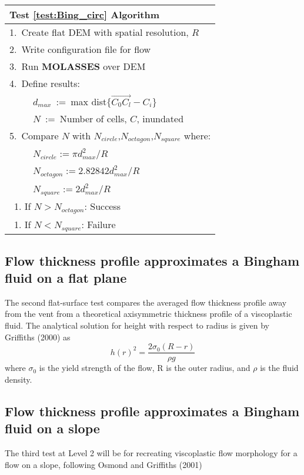 \documentclass[12pt,letter]{article}
\newcommand{\tabitem}{~~\llap{\textbullet}~~}
\begin{document}
\begin{center}
	\begin{tabular}{l}
		\toprule
		\textbf{Test \ref{test:Bing_circ} Algorithm}\\
		\midrule
		1.~Create flat DEM with spatial resolution, $R$\\
		2.~Write configuration file for flow\\
		3.~Run \textbf{MOLASSES} over DEM\\
		4.~Define results:\\
			~\tabitem $d_{max}$~:=~max dist$\{\overrightarrow{C_0C_l}-C_i\}$\\
			~\tabitem $N$~:=~Number of cells, $C$, inundated\\
		5.~Compare $N$ with $N_{circle}$,$N_{octagon}$,$N_{square}$ where:\\
			~\tabitem $N_{circle}:=\pi d_{max}^2/R$\\
			~\tabitem $N_{octagon}:=2.82842 d_{max}^2/R$\\
			~\tabitem $N_{square}:=2d_{max}^2/R$\\
			~1. If $N>N_{octagon}$: Success\\
			~1. If $N<N_{square}$: Failure\\
		\bottomrule
	\end{tabular}
\end{center}

\subsection{Flow thickness profile approximates a Bingham fluid on a flat plane}\label{test:Bing_thick}
The second flat-surface test compares the averaged flow thickness profile away from the vent from a theoretical axisymmetric thickness profile of a viscoplastic fluid. The analytical solution for height with respect to radius is given by Griffiths (2000) as
\begin{equation}
h(r)^2 = \frac{2\sigma_0(R-r)}{\rho g}
\end{equation}
where $\sigma_0$ is the yield strength of the flow, R is the outer radius, and $\rho$ is the fluid density. 

\subsection{Flow thickness profile approximates a Bingham fluid on a slope}\label{test:Bing_slope}
The third test at Level 2 will be for recreating viscoplastic flow morphology for a flow on a slope, following Osmond and Griffiths (2001)
\end{document}
